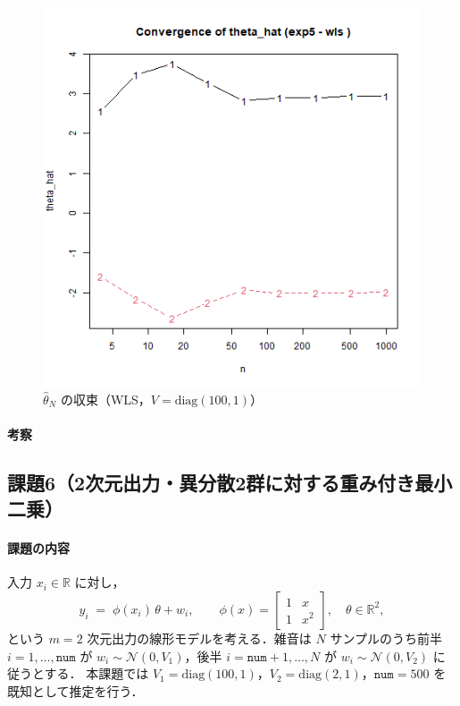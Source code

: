 \begin{figure}[H]
  \centering
  \includegraphics[width=.82\linewidth]{graphs/task5_wls.png}
  \caption{$\hat{\theta}_N$ の収束（WLS，$V=\mathrm{diag}(100,1)$）}
  \label{fig:task5_wls}
\end{figure}

\paragraph{考察}


\subsection{課題6（2次元出力・異分散2群に対する重み付き最小二乗）}

\paragraph{課題の内容}
入力 $x_i\in\mathbb{R}$ に対し，
\[
  y_i \;=\; \phi(x_i)\,\theta + w_i,\qquad
  \phi(x)=
  \begin{bmatrix}
    1 & x\\[1mm]
    1 & x^2
  \end{bmatrix},\quad
  \theta\in\mathbb{R}^2,
\]
という $m=2$ 次元出力の線形モデルを考える．雑音は $N$ サンプルのうち前半 $i=1,\dots,\texttt{num}$ が
$w_i\sim\mathcal{N}(0,V_1)$，後半 $i=\texttt{num}+1,\dots,N$ が $w_i\sim\mathcal{N}(0,V_2)$ に従うとする．
本課題では $V_1=\mathrm{diag}(100,1)$，$V_2=\mathrm{diag}(2,1)$，$\texttt{num}=500$ を既知として推定を行う．

